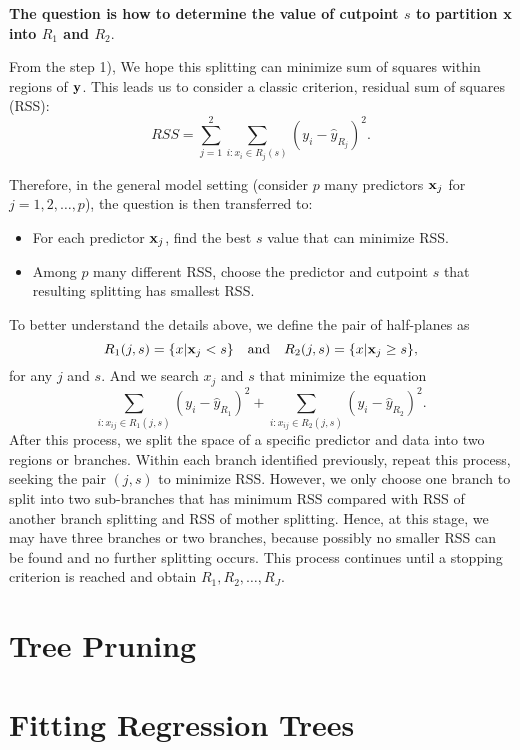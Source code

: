 \documentclass[]{book}
\begin{document}
\textbf{The question is how to determine the value of cutpoint \(s\) to partition \({\bf x}\) into \(R_1\) and \(R_2\)}.

From the step 1), We hope this splitting can minimize sum of squares within regions of \({\bf y}\). This leads us to consider a classic criterion, residual sum of squares (RSS):
\[
RSS = \sum_{j=1}^{2}\sum_{i:x_i\in R_j(s)}(y_i - \hat y_{R_j})^2.
\]

Therefore, in the general model setting (consider \(p\) many predictors \({\bf x}_j\) for \(j=1,2,\ldots,p\)), the question is then transferred to:

\begin{itemize}
\item
  For each predictor \({\bf x}_j\), find the best \(s\) value that can minimize RSS.
\item
  Among \(p\) many different RSS, choose the predictor and cutpoint \(s\) that resulting splitting has smallest RSS.
\end{itemize}

To better understand the details above, we define the pair of half-planes as
\[
R_1(j,s) = \{x|{\bf x}_j<s\}\quad \text{and} \quad R_2(j,s) = \{x|{\bf x}_j\geq s\}, 
\]
for any \(j\) and \(s\). And we search \(x_j\) and \(s\) that minimize the equation
\[
\sum_{i:x_{ij}\in R_1(j,s)}(y_i - \hat y_{R_1})^2 + \sum_{i:x_{ij}\in R_2(j,s)}(y_i - \hat y_{R_2})^2.
\]
After this process, we split the space of a specific predictor and data into two regions or branches. Within each branch identified previously, repeat this process, seeking the pair \((j,s)\) to minimize RSS. However, we only choose one branch to split into two sub-branches that has minimum RSS compared with RSS of another branch splitting and RSS of mother splitting. Hence, at this stage, we may have three branches or two branches, because possibly no smaller RSS can be found and no further splitting occurs. This process continues until a stopping criterion is reached and obtain \(R_1, R_2, \ldots, R_J\).

\hypertarget{tree-pruning}{%
\section{Tree Pruning}\label{tree-pruning}}

\hypertarget{fitting-regression-trees}{%
\section{Fitting Regression Trees}\label{fitting-regression-trees}}
\end{document}
